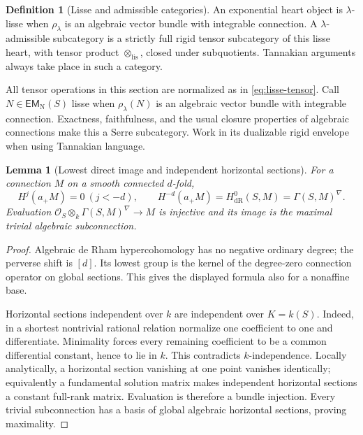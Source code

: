\documentclass[11pt]{article}
\numberwithin{equation}{section}
\newtheorem{lemma}[lemma]{Lemma}
\theoremstyle{definition}
\newtheorem{definition}[definition]{Definition}
\theoremstyle{remark}
\newcommand{\Ocal}{\mathcal O}
\newcommand{\EM}{\mathsf{EM}_{\mathrm N}}
\newcommand{\dR}{\mathrm{dR}}
\newcommand{\lis}{\mathrm{lis}}
\begin{document}
\begin{definition}[Lisse and admissible categories]\label{def:lisse-objects}
An exponential heart object is $\lambda$-lisse when $\rho_\lambda$ is an
algebraic vector bundle with integrable connection. A $\lambda$-admissible
subcategory is a strictly full rigid tensor subcategory of this lisse heart,
with tensor product $\otimes_{\lis}$, closed under subquotients. Tannakian
arguments always take place in such a category.
\end{definition}



All tensor operations in this section are normalized as in
\eqref{eq:lisse-tensor}. Call $N\in\EM(S)$ lisse when $\rho_\lambda(N)$
is an algebraic vector bundle with integrable connection. Exactness,
faithfulness, and the usual closure properties of algebraic connections
make this a Serre subcategory. Work in its dualizable rigid envelope when
using Tannakian language.

\begin{lemma}[Lowest direct image and independent horizontal sections]\label{lem:lowest}\label{lem:horizontal-evaluation}\label{lem:lowest-direct-image}
For a connection $M$ on a smooth connected $d$-fold,
\[
 H^j(a_+M)=0\ (j<-d),\qquad
 H^{-d}(a_+M)=H^0_{\dR}(S,M)=\Gamma(S,M)^\nabla.
\]
Evaluation $\Ocal_S\otimes_k\Gamma(S,M)^\nabla\to M$ is injective and
its image is the maximal trivial algebraic subconnection.
\end{lemma}
\begin{proof}
Algebraic de Rham hypercohomology has no negative ordinary degree; the
perverse shift is $[d]$. Its lowest group is the kernel of the degree-zero
connection operator on global sections. This gives the displayed formula
also for a nonaffine base.

Horizontal sections independent over $k$ are independent over $K=k(S)$.
Indeed, in a shortest nontrivial rational relation normalize one coefficient
to one and differentiate. Minimality forces every remaining coefficient to
be a common differential constant, hence to lie in $k$. This contradicts
$k$-independence. Locally analytically, a horizontal section vanishing at
one point vanishes identically; equivalently a fundamental solution
matrix makes independent horizontal sections a constant full-rank matrix.
Evaluation is therefore a bundle injection. Every trivial subconnection
has a basis of global algebraic horizontal sections, proving maximality.
\end{proof}
\end{document}
